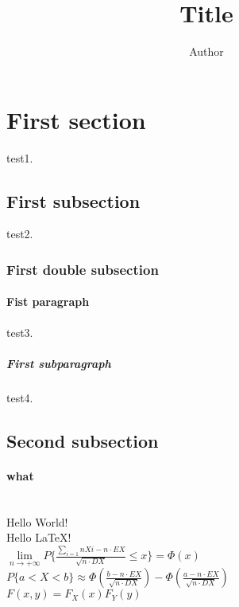 \documentclass{article}
\author {Author}
\title {Title}%
\begin{document}
\maketitle
\section{First section} test1.%
    \subsection{First subsection} test2.%
        \subsubsection{First double subsection}%
            \paragraph{Fist paragraph} test3.%
                \subparagraph{First subparagraph} test4.%
    \subsection{Second subsection}%
        \paragraph{what}
\\%
Hello World! \\ %
Hello \LaTeX ! \\

$\lim\limits_{n \rightarrow +\infty} P\lbrace\frac{\sum\limits_{i=1}{n}Xi - n\cdot EX}{ \sqrt{n \cdot DX} }  \leqslant x\rbrace = \Phi(x)$ \\

$P\lbrace a<X<b \rbrace \approx \Phi(\frac{b - n\cdot EX}{\sqrt {n\cdot DX}}) - \Phi(\frac{a - n\cdot EX}{\sqrt{n\cdot DX} })$ \\

$F(x,y) = F_{X}(x)F_{Y}(y)$
\end{document}
